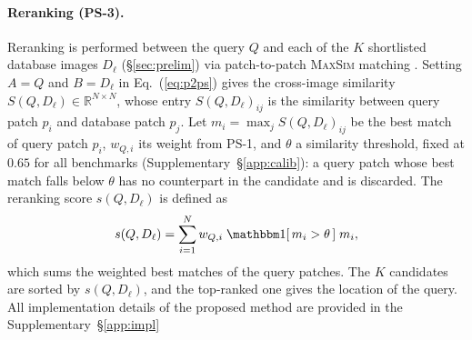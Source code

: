 \paragraph{Reranking (PS-3).}
\label{sec:core}
Reranking is performed between the query $Q$ and each of the $K$ shortlisted database images $D_\ell$ (\S\ref{sec:prelim}) via patch-to-patch \textsc{MaxSim} matching \citep{chamfer}. Setting $A=Q$ and $B=D_\ell$ in Eq.~(\ref{eq:p2ps}) gives the cross-image similarity $S(Q,D_\ell)\in\mathbb R^{N\times N}$, whose entry $S(Q,D_\ell)_{ij}$ is the similarity between query patch $p_i$ and database patch $p_j$. Let $m_i=\max_j S(Q,D_\ell)_{ij}$ be the best match of query patch $p_i$, $w_{Q,i}$ its weight from PS-1, and $\theta$ a similarity threshold, fixed at $0.65$ for all benchmarks (Supplementary~\S\ref{app:calib}): a query patch whose best match falls below $\theta$ has no counterpart in the candidate and is discarded. The reranking score $s(Q,D_\ell)$ is defined as
\begin{equation}\label{eq:stage2}
  s(Q,D_\ell)=\sum_{i=1}^{N} w_{Q,i}\;\ind[\,m_i>\theta\,]\;m_i ,
\end{equation}
which sums the weighted best matches of the query patches. The $K$ candidates are sorted by $s(Q,D_\ell)$, and the top-ranked one gives the location of the query. All implementation details of the proposed method are provided in the Supplementary~\S\ref{app:impl}
